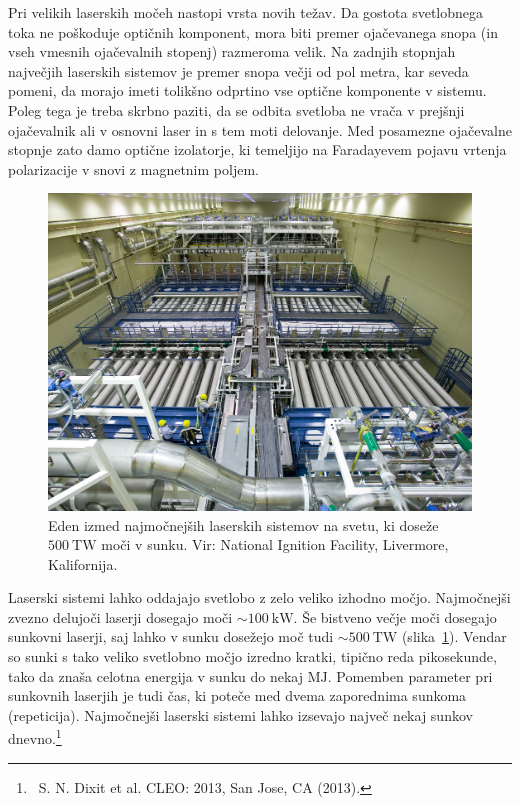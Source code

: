 Pri velikih laserskih močeh nastopi vrsta novih težav. Da gostota 
svetlobnega toka ne poškoduje optičnih komponent, mora biti
premer ojačevanega snopa (in vseh vmesnih ojačevalnih stopenj) razmeroma velik. 
Na zadnjih stopnjah največjih laserskih sistemov je 
premer snopa večji od pol metra, kar seveda pomeni, da morajo imeti tolikšno odprtino 
vse optične komponente v sistemu. Poleg tega je
treba skrbno paziti, da se odbita svetloba ne vrača v prejšnji
ojačevalnik ali v osnovni laser in s tem moti delovanje. Med
posamezne ojačevalne stopnje zato damo optične izolatorje, ki temeljijo na Faradayevem
pojavu vrtenja polarizacije v snovi z magnetnim poljem.
\begin{figure}[ht]
\centering
\includegraphics[width=90truemm]{slike/07_NIF_Laser_Bay.jpg}
\caption{Eden izmed najmočnejših laserskih sistemov na svetu, ki doseže 
$500~\si{\tera\watt}$ moči v sunku. Vir: National Ignition Facility, Livermore, Kalifornija.}
\label{fig:NIF}
\end{figure}

Laserski sistemi lahko oddajajo svetlobo z zelo veliko izhodno močjo. 
Najmočnejši zvezno delujoči laserji dosegajo moči 
$\sim 100~\si{\kilo\watt}$. Še bistveno večje moči dosegajo sunkovni laserji, 
saj lahko v sunku dosežejo moč tudi $\sim 500~\si{\tera\watt}$ (slika~\ref{fig:NIF}). 
Vendar so sunki s tako veliko svetlobno močjo izredno kratki, tipično reda pikosekunde, tako da
znaša celotna energija v sunku do nekaj $\si{\mega\joule}$. Pomemben
parameter pri sunkovnih laserjih je tudi čas, ki poteče med dvema zaporednima
sunkoma (repeticija). Najmočnejši laserski sistemi lahko izsevajo največ nekaj sunkov 
dnevno.\footnote{~S. N. Dixit et al. CLEO: 2013, San Jose, CA (2013).}

